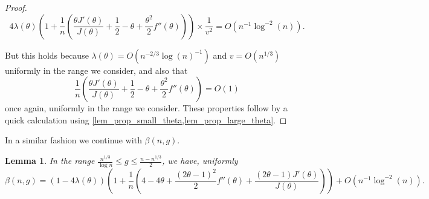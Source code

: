 \documentclass[a4paper,12pt]{article}
\newtheorem{lemma}[theorem]{Lemma}
\theoremstyle{definition}
\newcommand{\bigO}[1]{O\left({#1}\right)}
\newcommand{\err}{\bigO{n^{-1}\log^{-2}(n)}}
\begin{document}
\begin{proof}
\[4\lambda(\theta)\left(1+\frac{1}{n}\left(\frac{\theta J'\left(\theta\right)}{J\left(\theta\right)}+\frac{1}{2}-{\theta}+\frac{\theta^2}{2}f''(\theta)\right)\right)\times \frac{1}{v^2}=\err.\]

But this holds because $\lambda(\theta)=O(n^{-2/3} \log(n)^{-1})$ and $v=O(n^{1/3})$ uniformly in the range we consider, and also that 
\[\frac{1}{n}\left(\frac{\theta J'\left(\theta\right)}{J\left(\theta\right)}+\frac{1}{2}-{\theta}+\frac{\theta^2}{2}f''(\theta)\right)=O(1)\]
once again, uniformly in the range we consider. These properties follow by a quick calculation using \cref{lem_prop_small_theta,lem_prop_large_theta}.
\end{proof}

In a similar fashion we continue with $\beta(n,g)$.

\begin{lemma}\label{lem_beta_intermediate}
In the range $\frac{n^{1/3}}{\log n}\leq g\leq \frac{n-n^{1/3}}{2}$, we have, uniformly
    \[\beta(n,g)=(1-4\lambda(\theta))\left(1+\frac{1}{n}\left(4-4\theta+\frac{(2\theta-1)^2}{2}f''(\theta)+\frac{(2\theta-1)J'\left(\theta\right)}{J\left(\theta\right)}\right)\right)+\err.\]
\end{lemma}
\end{document}
